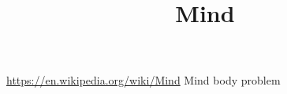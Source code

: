 \documentclass[a4paper]{article}
\title{Mind}
\date{}
\begin{document}
    \maketitle
    
    \url{https://en.wikipedia.org/wiki/Mind}
    Mind body problem
    
\end{document}
